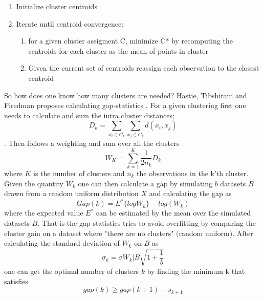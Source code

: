 \begin{enumerate}
	\item Initialize cluster centroids
	\item Iterate until centroid convergence:
		\begin{enumerate}
			\item for a given cluster assigment C, minimize C* by recomputing the centroids for each cluster as the mean of points in cluster
			\item Given the current set of centroids reassign each observation to the closest centroid
		\end{enumerate}
\end{enumerate}

So how does one know how many clusters are needed? Hastie, Tibshirani and Firedman proposes calculating gap-statistics \cite[p.~519]{statistical-learning}.
For a given clustering first one needs to calculate and sum the intra cluster distances;
\begin{equation}
D_k=\sum_{x_i\in C_k} \sum_{x_j\in C_k} d(x_i,x_j)
\end{equation}.
Then follows a weighting and sum over all the clusters
\begin{equation}
W_{K}=\sum_{k=1}^K \frac{1}{2n_k} D_k
\end{equation}
where $K$ is the number of clusters and $n_k$ the observations in the k'th cluster.
Given the quantity $W_k$ one can then calculate a gap by simulating $b$ datasets $B$ drawn from a random uniform distribution $X$ and calculating the gap as
\begin{equation}
Gap(k)=E^{*}\{log W_k\} - log(W_k)
\end{equation}
where the expected value $E^{*}$ can be estimated by the mean over the simulated datasets $B$. That is the gap statistics tries to avoid overfitting by comparing the cluster gain on a dataset where "there are no clusters" (random uniform).
After calculating the standard deviation of $W_k$ on $B$ as 
\begin{equation}
\sigma_k=\sigma{W_k | B}\sqrt{1+\frac{1}{b}}
\end{equation}
 one can get the optimal number of clusters $k$ by finding the minimum k that satisfies
\begin{equation}
gap(k)\ge gap(k+1)-s_{k+1}
\end{equation}